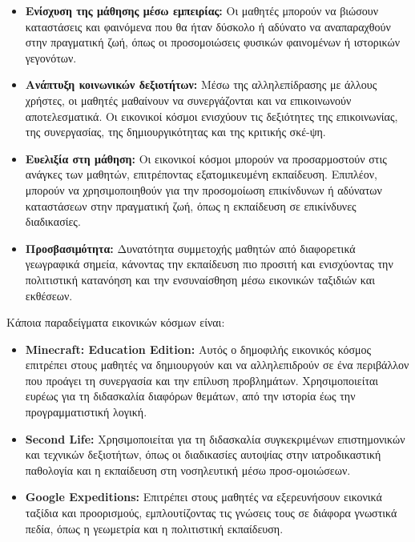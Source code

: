 \begin{itemize}
    \item \textbf{Ενίσχυση της μάθησης μέσω εμπειρίας:} Οι μαθητές μπορούν να βιώσουν καταστάσεις και φαινόμενα που θα ήταν δύσκολο ή αδύνατο να αναπαραχθούν στην πραγματική ζωή, όπως οι προσομοιώσεις φυσικών φαινομένων ή ιστορικών γεγονότων\cite{noauthor_virtual_nodate,noauthor_benefits_2019}.
    \item \textbf{Ανάπτυξη κοινωνικών δεξιοτήτων:} Μέσω της αλληλεπίδρασης με άλλους χρήστες, οι μαθητές μαθαίνουν να συνεργάζονται και να επικοινωνούν αποτελεσματικά. Οι εικονικοί κόσμοι ενισχύουν τις δεξιότητες της επικοινωνίας, της συνεργασίας, της δημιουργικότητας και της κριτικής σκέ-ψη\cite{noauthor_explore_nodate,staff_20_2022}.
    \item \textbf{Ευελιξία στη μάθηση:} Οι εικονικοί κόσμοι μπορούν να προσαρμοστούν στις ανάγκες των μαθητών, επιτρέποντας εξατομικευμένη εκπαίδευση. Επιπλέον, μπορούν να χρησιμοποιηθούν για την προσομοίωση επικίνδυνων ή αδύνατων καταστάσεων στην πραγματική ζωή, όπως η εκπαίδευση σε επικίνδυνες διαδικασίες\cite{staff_20_2022}.
    \item \textbf{Προσβασιμότητα:} Δυνατότητα συμμετοχής μαθητών από διαφορετικά γεωγραφικά σημεία, κάνοντας την εκπαίδευση πιο προσιτή και ενισχύοντας την πολιτιστική κατανόηση και την ενσυναίσθηση μέσω εικονικών ταξιδιών και εκθέσεων\cite{noauthor_virtual_nodate}.
\end{itemize}

Κάποια παραδείγματα εικονικών κόσμων είναι:

\begin{itemize}
    \item \textbf{Minecraft: Education Edition:} Αυτός ο δημοφιλής εικονικός κόσμος επιτρέπει στους μαθητές να δημιουργούν και να αλληλεπιδρούν σε ένα περιβάλλον που προάγει τη συνεργασία και την επίλυση προβλημάτων. Χρησιμοποιείται ευρέως για τη διδασκαλία διαφόρων θεμάτων, από την ιστορία έως την προγραμματιστική λογική\cite{noauthor_explore_nodate}.
    \item \textbf{Second Life:} Χρησιμοποιείται για τη διδασκαλία συγκεκριμένων επιστημονικών και τεχνικών δεξιοτήτων, όπως οι διαδικασίες αυτοψίας στην ιατροδικαστική παθολογία και η εκπαίδευση στη νοσηλευτική μέσω προσ-ομοιώσεων\cite{staff_20_2022}.
    \item \textbf{Google Expeditions:} Επιτρέπει στους μαθητές να εξερευνήσουν εικονικά ταξίδια και προορισμούς, εμπλουτίζοντας τις γνώσεις τους σε διάφορα γνωστικά πεδία, όπως η γεωμετρία και η πολιτιστική εκπαίδευση\cite{noauthor_benefits_2019}.
\end{itemize}

